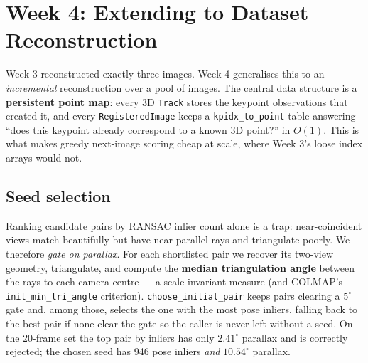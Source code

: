 \documentclass{article} %
\begin{document}

\section{Week 4: Extending to Dataset Reconstruction}

Week 3 reconstructed exactly three images. Week 4 generalises this to an
\emph{incremental} reconstruction over a pool of images. The central data
structure is a \textbf{persistent point map}: every 3D \texttt{Track} stores the
keypoint observations that created it, and every \texttt{RegisteredImage} keeps a
\texttt{kpidx\_to\_point} table answering ``does this keypoint already correspond
to a known 3D point?'' in $O(1)$. This is what makes greedy next-image scoring
cheap at scale, where Week 3's loose index arrays would not.

\subsection{Seed selection}
Ranking candidate pairs by RANSAC inlier count alone is a trap: near-coincident
views match beautifully but have near-parallel rays and triangulate poorly. We
therefore \emph{gate on parallax}. For each shortlisted pair we recover its
two-view geometry, triangulate, and compute the \textbf{median triangulation
angle} between the rays to each camera centre --- a scale-invariant measure (and
COLMAP's \texttt{init\_min\_tri\_angle} criterion). \texttt{choose\_initial\_pair}
keeps pairs clearing a $5^\circ$ gate and, among those, selects the one with the
most pose inliers, falling back to the best pair if none clear the gate so the
caller is never left without a seed. On the 20-frame set the top pair by inliers
has only $2.41^\circ$ parallax and is correctly rejected; the chosen seed has
946 pose inliers \emph{and} $10.54^\circ$ parallax.
\end{document}
